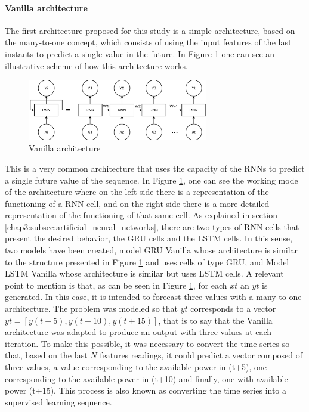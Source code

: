 \paragraph*{Vanilla architecture}

The first architecture proposed for this study is a simple architecture, based on the many-to-one concept, which consists of using the input features of the last instants to predict a single value in the future. 
In Figure \ref{arc1} one can see an illustrative scheme of how this architecture works.

\begin{figure}[h!]
    \centering
    \begin{center}
    \includegraphics[width=0.7\textwidth]{Images/arc1.png}
    \caption{Vanilla architecture}
    \label{arc1}
    \end{center}
\end{figure}

This is a very common architecture that uses the capacity of the \ac{RNN}s to predict a single future value of the sequence. In Figure \ref{arc1}, one can see the working mode of the architecture where on the left side there is a representation of the functioning of a RNN cell, and on the right side there is a more detailed representation of the functioning of that same cell. As explained in section \ref{chap3:subsec:artificial_neural_networks}, there are two types of \ac{RNN} cells that present the desired behavior, the \ac{GRU} cells and the \ac{LSTM} cells. In this sense, two models have been created, model \ac{GRU} Vanilla whose architecture is similar to the structure presented in Figure \ref{arc1} and uses cells of type \ac{GRU}, and Model \ac{LSTM} Vanilla whose architecture is similar but uses \ac{LSTM} cells. A relevant point to mention is that, as can be seen in Figure \ref{arc1}, for each $xt$ an $yt$ is generated. In this case, it is intended to forecast three values with a many-to-one architecture. The problem was modeled so that $yt$ corresponds to a vector $yt = [y(t+5), y(t+10), y(t+15)]$, that is to say that the Vanilla architecture was adapted to produce an output with three values at each iteration. To make this possible, it was necessary to convert the time series so that, based on the last $N$ features readings, it could predict a vector composed of three values, a value corresponding to the available power in (t+5), one corresponding to the available power in (t+10) and finally, one with available power (t+15). This process is also known as converting the time series into a supervised learning sequence.



